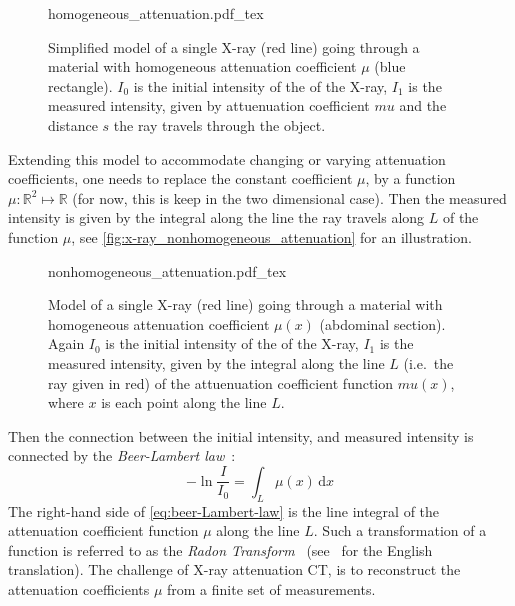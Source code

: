 \begin{figure}[t]
	\centering
	\def\svgwidth{0.75\textwidth}
	{homogeneous_attenuation.pdf_tex}
	\caption{Simplified model of a single X-ray (red line) going through a material with
		homogeneous attenuation coefficient \(\mu\) (blue rectangle). \(I_0\) is the initial
		intensity of the of the X-ray, \(I_1\) is the measured intensity, given by
		attuenuation coefficient \(mu\) and the distance \(s\) the ray travels through the
		object.}\label{fig:x-ray_homogeneous_attenuation}
\end{figure}

Extending this model to accommodate changing or varying attenuation coefficients, one needs to
replace the constant coefficient \(\mu\), by a function \(\mu: \mathbb{R}^2 \mapsto \mathbb{R}\)
(for now, this is keep in the two dimensional case). Then the measured intensity is given by the
integral along the line the ray travels along \(L\) of the function \(\mu\), see
\autoref{fig:x-ray_nonhomogeneous_attenuation} for an illustration.

\begin{figure}[t]
	\centering
	\def\svgwidth{0.75\textwidth}
	{nonhomogeneous_attenuation.pdf_tex}
	\caption{Model of a single X-ray (red line) going through a material with
		homogeneous attenuation coefficient \(\mu(x)\) (abdominal section). Again \(I_0\) is
		the initial intensity of the of the X-ray, \(I_1\) is the measured intensity, given
		by the integral along the line \(L\) (i.e.\ the ray given in red) of the
		attuenuation coefficient function \(mu(x)\), where \(x\) is each point along the
		line \(L\).}\label{fig:x-ray_nonhomogeneous_attenuation}
\end{figure}

Then the connection between the initial intensity, and measured intensity is connected by the
\textit{Beer-Lambert law}~\cite{buzug_computed_2008}:
\begin{equation}\label{eq:beer-Lambert-law}
	- \ln \frac{I}{I_0} = \int_L \mu (x) \, \mathrm{d}x
\end{equation}
The right-hand side of \autoref{eq:beer-Lambert-law} is the line integral of the attenuation
coefficient function \(\mu\) along the line \(L\). Such a transformation of a function is referred
to as the \textit{Radon Transform}~\cite{radon_uber_1917} (see~\cite{radon_determination_1986} for
the English translation). The challenge of X-ray attenuation CT, is to reconstruct the attenuation
coefficients \(\mu\) from a finite set of measurements.

